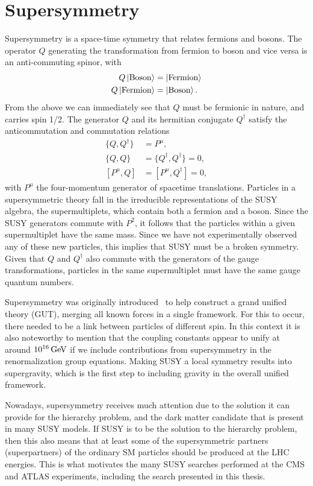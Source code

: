 \chapter{Supersymmetry \label{chap:supersymmetry}}

Supersymmetry is a space-time symmetry that relates fermions and bosons. The operator $Q$
generating the transformation from fermion to boson and vice versa is an anti-commuting spinor, with
\begin{align}
  Q \Ket{\textrm{Boson}} &= \Ket{\textrm{Fermion}} \\
  Q \Ket{\textrm{Fermion}} &= \Ket{\textrm{Boson}} .
\end{align}
From the above we can immediately see that $Q$ must be fermionic in nature, and carries spin 1/2. 
The generator $Q$ and its hermitian conjugate $Q^\dagger$ satisfy the anticommutation and
commutation relations
\begin{align}
  \{Q,Q^\dagger\} &= P^\mu ,\\
  \{Q,Q\} &= \{Q^\dagger,Q^\dagger\} = 0, \\
  \left[P^\mu,Q\right] &= \left[P^\mu,Q^\dagger\right] = 0 ,
\end{align}
with $P^\mu$ the four-momentum generator of spacetime translations. 
Particles in a supersymmetric theory fall in the irreducible representations of the SUSY algebra,
the supermultiplets, which contain both a fermion and a boson. 
Since the SUSY generators commute with $P^2$, it follows that the particles within a given
supermultiplet have the same mass. Since we have not experimentally observed any of these new
particles, this implies that SUSY must be a broken symmetry. 
Given that $Q$ and $Q^\dagger$ also commute with the generators of the gauge transformations, 
particles in the same supermultiplet must have the same gauge quantum numbers. 

Supersymmetry was originally introduced~\cite{Wess,Golfand,Chamseddine,Kane,Fayet,Barbieri,Hall} to
help construct a grand unified theory (GUT), merging all known forces in a single framework. For
this to occur, there needed to be a link between particles of different spin. In this context it is
also noteworthy to mention that the coupling constants appear to unify at around
$\text{10}^\text{16}\,\text{Ge\hspace{-.08em}V}$ if we include contributions from supersymmetry in the renormalization
group equations. Making SUSY a local symmetry results into supergravity, which is the first step to
including gravity in the overall unified framework. 

Nowadays, supersymmetry receives much attention due to the solution it can provide for the
hierarchy problem, and the dark matter candidate that is present in many SUSY models. If SUSY is to
be the solution to the hierarchy problem, then this also means that at least some of the
supersymmetric partners (superpartners) of the ordinary SM particles should be produced at the LHC
energies. This is what motivates the many SUSY searches performed at the CMS and ATLAS experiments,
including the search presented in this thesis. 

